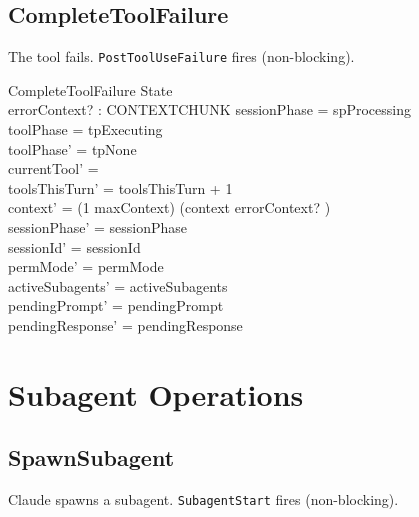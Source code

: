 \documentclass[a4paper,10pt,fleqn]{article}
\begin{document}
\subsection{CompleteToolFailure}

The tool fails. \texttt{PostToolUseFailure} fires (non-blocking).

\begin{schema}{CompleteToolFailure}
  \Delta State \\
  errorContext? : CONTEXTCHUNK
  \where
  sessionPhase = spProcessing \\
  toolPhase = tpExecuting \\
  toolPhase' = tpNone \\
  currentTool' = \emptyset \\
  toolsThisTurn' = toolsThisTurn + 1 \\
  context' = (1 \upto maxContext) \dres (context \cat \langle errorContext? \rangle) \\
  sessionPhase' = sessionPhase \\
  sessionId' = sessionId \\
  permMode' = permMode \\
  activeSubagents' = activeSubagents \\
  pendingPrompt' = pendingPrompt \\
  pendingResponse' = pendingResponse
\end{schema}

\section{Subagent Operations}

\subsection{SpawnSubagent}

Claude spawns a subagent. \texttt{SubagentStart} fires (non-blocking).
\end{document}
